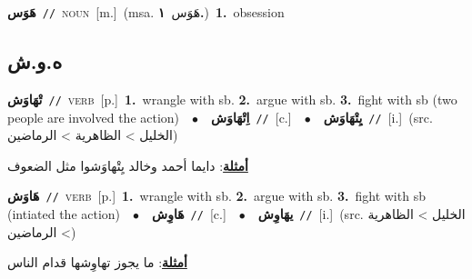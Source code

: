 \documentclass[10pt,a4paper,twoside]{article} %
\begin{document}
\begin{multicols}{2}
{\setlength\topsep{0pt}\textbf{\foreignlanguage{arabic}{هَوَس}}\ {\color{gray}\texttt{//}\color{black}}\ \textsc{noun}\ [m.]\ \color{gray}(msa. \foreignlanguage{arabic}{هَوَس}~\foreignlanguage{arabic}{\textbf{١.}})\color{black}\ \textbf{1.}~obsession\ } \vspace{2mm}

\vspace{-3mm}
\subsection*{\color{blue}\foreignlanguage{arabic}{ه.و.ش}\color{blue}{}} 

{\setlength\topsep{0pt}\textbf{\foreignlanguage{arabic}{تْهَاوَش}}\ {\color{gray}\texttt{//}\color{black}}\ \textsc{verb}\ [p.]\ \textbf{1.}~wrangle with sb.  \textbf{2.}~argue with sb.  \textbf{3.}~fight with sb (two people are involved the action)\ \ $\bullet$\ \ \setlength\topsep{0pt}\textbf{\foreignlanguage{arabic}{اِتْهَاوَش}}\ {\color{gray}\texttt{//}\color{black}}\ [c.]\ \ $\bullet$\ \ \setlength\topsep{0pt}\textbf{\foreignlanguage{arabic}{يِتْهَاوَش}}\ {\color{gray}\texttt{//}\color{black}}\ [i.]\ (src. \color{gray}\foreignlanguage{arabic}{الخليل > الظاهرية > الرماضين}\color{black})\  \begin{flushright}\color{gray}\foreignlanguage{arabic}{\textbf{\underline{\foreignlanguage{arabic}{أمثلة}}}: دايما أحمد وخالد يِتْهاوَشوا مثل الضعوف}\end{flushright}\color{black}} \vspace{2mm}

{\setlength\topsep{0pt}\textbf{\foreignlanguage{arabic}{هَاوَش}}\ {\color{gray}\texttt{//}\color{black}}\ \textsc{verb}\ [p.]\ \textbf{1.}~wrangle with sb.  \textbf{2.}~argue with sb.  \textbf{3.}~fight with sb (intiated the action)\ \ $\bullet$\ \ \setlength\topsep{0pt}\textbf{\foreignlanguage{arabic}{هَاوِش}}\ {\color{gray}\texttt{//}\color{black}}\ [c.]\ \ $\bullet$\ \ \setlength\topsep{0pt}\textbf{\foreignlanguage{arabic}{يهَاوِش}}\ {\color{gray}\texttt{//}\color{black}}\ [i.]\ (src. \color{gray}\foreignlanguage{arabic}{الخليل > الظاهرية > الرماضين}\color{black})\  \begin{flushright}\color{gray}\foreignlanguage{arabic}{\textbf{\underline{\foreignlanguage{arabic}{أمثلة}}}: ما يجوز تهاوِشها قدام الناس}\end{flushright}\color{black}} \vspace{2mm}


\end{multicols}
\end{document}
